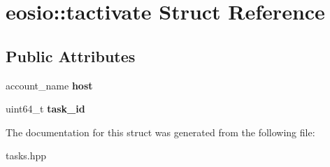 \hypertarget{structeosio_1_1tactivate}{}\section{eosio\+:\+:tactivate Struct Reference}
\label{structeosio_1_1tactivate}
\subsection*{Public Attributes}
\begin{DoxyCompactItemize}
\item 
\mbox{\label{structeosio_1_1tactivate_ad2fa1b43828a9b420c40a9b85ac76e83}} 
account\+\_\+name {\bfseries host}
\item 
\mbox{\label{structeosio_1_1tactivate_a8c6217cb79fa46b0621d759b9d1ad29d}} 
uint64\+\_\+t {\bfseries task\+\_\+id}
\end{DoxyCompactItemize}


The documentation for this struct was generated from the following file\+:\begin{DoxyCompactItemize}
\item 
tasks.\+hpp\end{DoxyCompactItemize}
